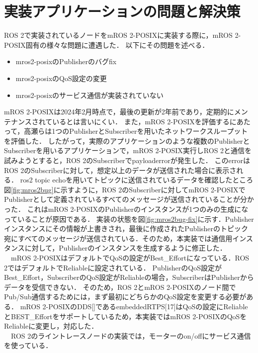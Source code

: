 \section{実装アプリケーションの問題と解決策}
ROS 2で実装されているノードをmROS 2-POSIXに実装する際に，mROS 2-POSIX固有の様々な問題に遭遇した．
以下にその問題を述べる．
\begin{itemize}
    \item mros2-posixのPublisherのバグfix
    \item mros2-posixのQoS設定の変更
    \item mros2-posixのサービス通信が実装されていない
\end{itemize}
mROS 2-POSIXは2024年2月時点で，最後の更新が2年前であり，定期的にメンテナンスされているとは言いにくい．
また，mROS 2-POSIXを評価するにあたって，高瀬らは1つのPublisherとSubscriberを用いたネットワークスループットを評価した．
したがって，実際のアプリケーションのような複数のPublisherとSubscriberを用いるアプリケーションで，mROS 2-POSIX実行しROS 2と通信を試みようとすると，ROS 2のSubscriberでpayloaderrorが発生した．
このerrorはROS 2のSubscriberに対して，想定以上のデータが送信された場合に表示される．
ros2 topic echoを用いてトピックに送信されているデータを確認したところ図\ref{fig:mros2bug}に示すように，ROS 2のSubscriberに対してmROS 2-POSIXでPublisherとして定義されているすべてのメッセージが送信されていることが分かった．
これはmROS 2-POSIXのPublisherのインスタンスが1つのみの生成になっていることが原因である．
実装の状態を図\ref{fig:mros2bug-fix}に示す．Publisherインスタンスにその情報が上書きされ，最後に作成されたPublisherのトピック宛にすべてのメッセージが送信されている．そのため，本実装では通信用インスタンスに対して，Publisherのインスタンスを生成するように修正した．
\\　mROS 2-POSIXはデフォルトでQoSの設定がBest\_Effortになっている．ROS 2ではデフォルトでReliableに設定されている．
PublisherのQoS設定がBest\_Effort，SubscriberのQoS設定がReliableの場合，SubscriberはPublisherからデータを受信できない．
そのため，ROS 2とmROS 2-POSIXのノード間でPub/Sub通信するためには，まず最初にどちらかのQoS設定を変更する必要がある．
mROS 2-POSIXのDDS[]であるembeddedRTPS[17]はQoSの設定にReliableとBEST\_Effortをサポートしているため，本実装ではmROS 2-POSIXのQoSをReliableに変更し，対応した．
\\　ROS 2のライントレースノードの実装では，モーターのon/offにサービス通信を使っている．
